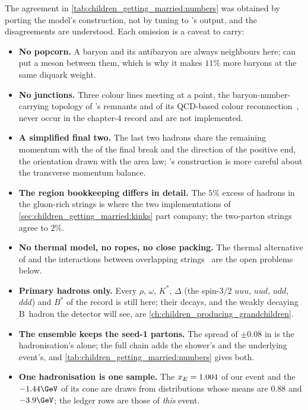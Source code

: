 The agreement in \cref{tab:children_getting_married:numbers} was obtained
by porting the model's construction, not by tuning to \PYTHIA's output, and
the disagreements are understood. Each omission is a caveat to carry:
\begin{itemize}
  \item \textbf{No popcorn.} A baryon and its antibaryon are always
    neighbours here; \PYTHIA can put a meson between them, which is why it
    makes $11\%$ more baryons at the same diquark weight.
  \item \textbf{No junctions.} Three colour lines meeting at a point, the
    baryon-number-carrying topology of \PYTHIA's remnants and of its
    QCD-based colour reconnection~\cite{Sjostrand:2002ip,Christiansen:2015yqa},
    never occur in the chapter-4 record and are not implemented.
  \item \textbf{A simplified final two.} The last two hadrons share the
    remaining momentum with the \pt of the final break and the direction
    of the positive end, the orientation drawn with the area law; \PYTHIA's
    construction is more careful about the transverse momentum balance.
  \item \textbf{The region bookkeeping differs in detail.} The $5\%$ excess
    of hadrons in the gluon-rich strings is where the two implementations
    of \cref{sec:children_getting_married:kinks} part company; the
    two-parton strings agree to $2\%$.
  \item \textbf{No thermal model, no ropes, no close packing.} The thermal
    \pt alternative of \cite{Fischer:2016zzs} and the interactions between
    overlapping strings~\cite{Bierlich:2014xba} are the open problems below.
  \item \textbf{Primary hadrons only.} Every $\rho$, $\omega$, $K^*$,
    $\Delta$ (the spin-$3/2$ $uuu$, $uud$, $udd$, $ddd$) and $B^*$ of the
    record is still here; their decays, and the
    weakly decaying B~hadron the detector will see, are
    \cref{ch:children_producing_grandchildren}.
  \item \textbf{The ensemble keeps the seed-1 partons.} The spread of
    $\pm0.08$ in \xE is the hadronisation's alone; the full chain adds the
    shower's and the underlying event's, and \cref{tab:children_getting_married:numbers}
    gives both.
  \item \textbf{One hadronisation is one sample.} The $x_E=1.004$ of our
    event and the $-1.44\GeV$ of its cone are draws from distributions whose
    means are $0.88$ and $-3.9\GeV$; the ledger rows are those of
    \emph{this} event.
\end{itemize}

